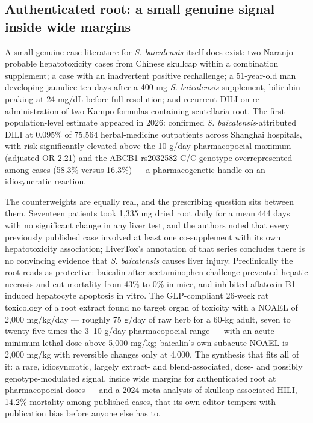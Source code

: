 \subsection{Authenticated root: a small genuine signal inside wide margins}

A small genuine case literature for \textit{S. baicalensis} itself does exist: two Naranjo-probable hepatotoxicity cases from Chinese skullcap within a combination supplement; a case with an inadvertent positive rechallenge; a 51-year-old man developing jaundice ten days after a 400 mg \textit{S. baicalensis} supplement, bilirubin peaking at 24 mg/dL before full resolution; and recurrent DILI on re-administration of two Kampo formulas containing scutellaria root. The first population-level estimate appeared in 2026: confirmed \textit{S. baicalensis}-attributed DILI at 0.095\% of 75{,}564 herbal-medicine outpatients across Shanghai hospitals, with risk significantly elevated above the 10 g/day pharmacopoeial maximum (adjusted OR 2.21) and the ABCB1 rs2032582 C/C genotype overrepresented among cases (58.3\% versus 16.3\%) --- a pharmacogenetic handle on an idiosyncratic reaction.

The counterweights are equally real, and the prescribing question sits between them. Seventeen patients took 1{,}335 mg dried root daily for a mean 444 days with no significant change in any liver test, and the authors noted that every previously published case involved at least one co-supplement with its own hepatotoxicity association; LiverTox's annotation of that series concludes there is no convincing evidence that \textit{S. baicalensis} causes liver injury. Preclinically the root reads as protective: baicalin after acetaminophen challenge prevented hepatic necrosis and cut mortality from 43\% to 0\% in mice, and inhibited aflatoxin-B1-induced hepatocyte apoptosis in vitro. The GLP-compliant 26-week rat toxicology of a root extract found no target organ of toxicity with a NOAEL of 2{,}000 mg/kg/day --- roughly 75 g/day of raw herb for a 60-kg adult, seven to twenty-five times the 3--10 g/day pharmacopoeial range --- with an acute minimum lethal dose above 5{,}000 mg/kg; baicalin's own subacute NOAEL is 2{,}000 mg/kg with reversible changes only at 4{,}000. The synthesis that fits all of it: a rare, idiosyncratic, largely extract- and blend-associated, dose- and possibly genotype-modulated signal, inside wide margins for authenticated root at pharmacopoeial doses --- and a 2024 meta-analysis of skullcap-associated HILI, 14.2\% mortality among published cases, that its own editor tempers with publication bias before anyone else has to.

